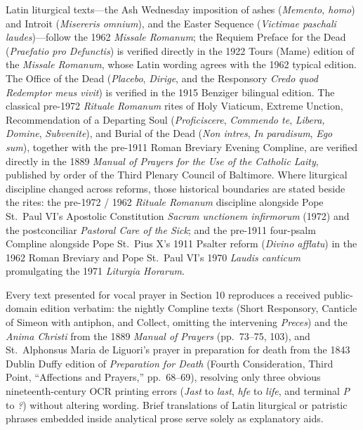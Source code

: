 Latin liturgical texts---the Ash Wednesday imposition of ashes (\textit{Memento, homo}) and Introit (\textit{Misereris omnium}), and the Easter Sequence (\textit{Victimae paschali laudes})---follow the 1962 \textit{Missale Romanum}; the Requiem Preface for the Dead (\textit{Praefatio pro Defunctis}) is verified directly in the 1922 Tours (Mame) edition of the \textit{Missale Romanum}, whose Latin wording agrees with the 1962 typical edition. The Office of the Dead (\textit{Placebo}, \textit{Dirige}, and the Responsory \textit{Credo quod Redemptor meus vivit}) is verified in the 1915 Benziger bilingual edition. The classical pre-1972 \textit{Rituale Romanum} rites of Holy Viaticum, Extreme Unction, Recommendation of a Departing Soul (\textit{Proficiscere}, \textit{Commendo te}, \textit{Libera, Domine}, \textit{Subvenite}), and Burial of the Dead (\textit{Non intres}, \textit{In paradisum}, \textit{Ego sum}), together with the pre-1911 Roman Breviary Evening Compline, are verified directly in the 1889 \textit{Manual of Prayers for the Use of the Catholic Laity}, published by order of the Third Plenary Council of Baltimore. Where liturgical discipline changed across reforms, those historical boundaries are stated beside the rites: the pre-1972 / 1962 \textit{Rituale Romanum} discipline alongside Pope St.\ Paul VI's Apostolic Constitution \textit{Sacram unctionem infirmorum} (1972) and the postconciliar \textit{Pastoral Care of the Sick}; and the pre-1911 four-psalm Compline alongside Pope St.\ Pius X's 1911 Psalter reform (\textit{Divino afflatu}) in the 1962 Roman Breviary and Pope St.\ Paul VI's 1970 \textit{Laudis canticum} promulgating the 1971 \textit{Liturgia Horarum}.

Every text presented for vocal prayer in Section 10 reproduces a received public-domain edition verbatim: the nightly Compline texts (Short Responsory, Canticle of Simeon with antiphon, and Collect, omitting the intervening \textit{Preces}) and the \textit{Anima Christi} from the 1889 \textit{Manual of Prayers} (pp.\ 73--75, 103), and St.\ Alphonsus Maria de Liguori's prayer in preparation for death from the 1843 Dublin Duffy edition of \textit{Preparation for Death} (Fourth Consideration, Third Point, ``Affections and Prayers,'' pp.\ 68--69), resolving only three obvious nineteenth-century OCR printing errors (\textit{Jast} to \textit{last}, \textit{hfe} to \textit{life}, and terminal \textit{P} to \textit{?}) without altering wording. Brief translations of Latin liturgical or patristic phrases embedded inside analytical prose serve solely as explanatory aids.

